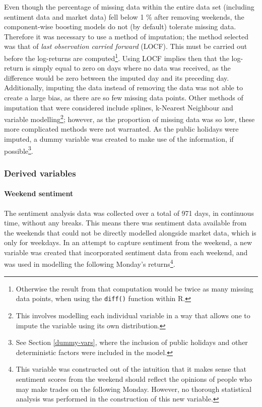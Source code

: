 \documentclass{article}
\begin{document}
Even though the percentage of missing data within the entire data set (including sentiment data and market data) fell below 1 \% after removing weekends, the component-wise boosting models do not (by default) tolerate missing data. Therefore it was necessary to use a method of imputation; the method selected was that of \emph{last observation carried forward} (LOCF). This must be carried out before the log-returns are computed\footnote{Otherwise the result from that computation would be twice as many missing data points, when using the \texttt{diff()} function within R.}. Using LOCF implies then that the log-return is simply equal to zero on days where no data was received, as the difference would be zero between the imputed day and its preceding day. Additionally, imputing the data instead of removing the data was not able to create a large bias, as there are so few missing data points. Other methods of imputation that were considered include splines, k-Nearest Neighbour and variable modelling\footnote{This involves modelling each individual variable in a way that allows one to impute the variable using its own distribution.}; however, as the proportion of missing data was so low, these more complicated methods were not warranted. As the public holidays were imputed, a dummy variable was created to make use of the information, if possible\footnote{See Section \ref{dummy-vars}, where the inclusion of public holidays and other deterministic factors were included in the model.}.


\subsubsection{Derived variables}
\label{sec-1-2-3}


\paragraph{Weekend sentiment \label{weekend-sent}}
\label{sec-1-2-3-1}

The sentiment analysis data was collected over a total of 971 days, in continuous time, without any breaks. This means there was sentiment data available from the weekends that could not be directly modelled alongside market data, which is only for weekdays. In an attempt to capture sentiment from the weekend, a new variable was created that incorporated sentiment data from each weekend, and was used in modelling the following Monday's returns\footnote{This variable was constructed out of the intuition that it makes sense that sentiment scores from the weekend should reflect the opinions of people who may make trades on the following Monday. However, no thorough statistical analysis was performed in the construction of this new variable.}.
\end{document}
